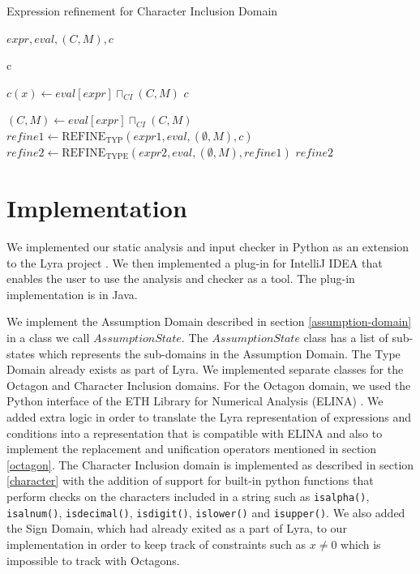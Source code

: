\documentclass[10pt]{report}
\begin{document}
\begin{algorithm}[H]
	\caption{Expression refinement for Character Inclusion Domain} \label{refineC}
	\begin{algorithmic}
		 {$ expr, eval, (C, M), c$}
		
		\State \Return c
		\EndIf
		
		\State $ c(x) \gets eval[expr] \sqcap_{CI} (C, M)$
		\State \Return $ c $
		\EndIf
		
		\State $ (C, M) \gets eval[expr] \sqcap_{CI} (C, M)  $
		\State $ refine1 \gets \mathrm{REFINE}_{\mathrm{TYP}}(expr1, eval, (\emptyset, M), c) $
		\State $ refine2 \gets \mathrm{REFINE}_{\mathrm{TYPE}}(expr2, eval, (\emptyset, M), refine1) $
		\State \Return $ refine2 $
		\EndIf
		
		\EndFunction
	\end{algorithmic}
\end{algorithm}


\chapter{Implementation} \label{implementation}

We implemented our static analysis and input checker in Python as an extension to the Lyra project \cite{lyra}. We then implemented a plug-in for IntelliJ IDEA that enables the user to use the analysis and checker as a tool. The plug-in implementation is in Java. 



We implement the Assumption Domain described in section \ref{assumption-domain} in a class we call $ AssumptionState $.  The $ AssumptionState $ class has a list of sub-states which represents the sub-domains in the Assumption Domain. The Type Domain already exists as part of Lyra. We implemented separate classes for the Octagon and Character Inclusion domains. For the Octagon domain, we used the Python interface of the ETH Library for Numerical Analysis (ELINA) \cite{singh}. We added extra logic in order to translate the Lyra representation of expressions and conditions into a representation that is compatible with ELINA and also to implement the replacement and unification operators mentioned in section \ref{octagon}. The Character Inclusion domain is implemented as described in section \ref{character} with the addition of support for built-in python functions that perform checks on the characters included in a string such as \verb|isalpha()|, \verb|isalnum()|, \verb|isdecimal()|, \verb|isdigit()|, \verb|islower()| and \verb|isupper()|. We also added the Sign Domain, which had already exited as a part of Lyra, to our implementation in order to keep track of constraints such as $ x \neq 0 $ which is impossible to track with Octagons. 
\end{document}
